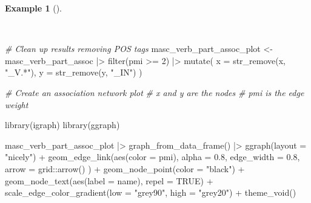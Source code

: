 \documentclass[
  letterpaper,
]{latex/krantz}
\newenvironment{Shaded}{\begin{snugshade}}{\end{snugshade}}
\newcommand{\AttributeTok}[1]{\textcolor[rgb]{0.00,0.00,0.00}{#1}}
\newcommand{\CommentTok}[1]{\textcolor[rgb]{0.00,0.00,0.00}{\textit{#1}}}
\newcommand{\ConstantTok}[1]{\textcolor[rgb]{0.00,0.00,0.00}{#1}}
\newcommand{\DecValTok}[1]{\textcolor[rgb]{0.00,0.00,0.00}{#1}}
\newcommand{\FloatTok}[1]{\textcolor[rgb]{0.00,0.00,0.00}{#1}}
\newcommand{\FunctionTok}[1]{\textcolor[rgb]{0.00,0.00,0.00}{#1}}
\newcommand{\NormalTok}[1]{\textcolor[rgb]{0.00,0.00,0.00}{#1}}
\newcommand{\OtherTok}[1]{\textcolor[rgb]{0.00,0.00,0.00}{#1}}
\newcommand{\SpecialCharTok}[1]{\textcolor[rgb]{0.00,0.00,0.00}{#1}}
\newcommand{\StringTok}[1]{\textcolor[rgb]{0.00,0.00,0.00}{#1}}
\theoremstyle{definition}
\newtheorem{example}{Example}[chapter]
\theoremstyle{remark}
\begin{document}
\begin{example}[]\protect\hypertarget{exm-eda-masc-verb-part-network}{}\label{exm-eda-masc-verb-part-network}

~

\begin{Shaded}
\begin{Highlighting}[]
\CommentTok{\# Clean up results removing POS tags}
\NormalTok{masc\_verb\_part\_assoc\_plot }\OtherTok{\textless{}{-}}
\NormalTok{  masc\_verb\_part\_assoc }\SpecialCharTok{|\textgreater{}}
  \FunctionTok{filter}\NormalTok{(pmi }\SpecialCharTok{\textgreater{}=} \DecValTok{2}\NormalTok{) }\SpecialCharTok{|\textgreater{}}
  \FunctionTok{mutate}\NormalTok{(}
    \AttributeTok{x =} \FunctionTok{str\_remove}\NormalTok{(x, }\StringTok{"\_V.*"}\NormalTok{),}
    \AttributeTok{y =} \FunctionTok{str\_remove}\NormalTok{(y, }\StringTok{"\_IN"}\NormalTok{)}
\NormalTok{  )}

\CommentTok{\# Create an association network plot}
\CommentTok{\# \textasciigrave{}x\textasciigrave{} and \textasciigrave{}y\textasciigrave{} are the nodes}
\CommentTok{\# \textasciigrave{}pmi\textasciigrave{} is the edge weight}

\FunctionTok{library}\NormalTok{(igraph)}
\FunctionTok{library}\NormalTok{(ggraph)}

\NormalTok{masc\_verb\_part\_assoc\_plot }\SpecialCharTok{|\textgreater{}}
  \FunctionTok{graph\_from\_data\_frame}\NormalTok{() }\SpecialCharTok{|\textgreater{}}
  \FunctionTok{ggraph}\NormalTok{(}\AttributeTok{layout =} \StringTok{"nicely"}\NormalTok{) }\SpecialCharTok{+}
  \FunctionTok{geom\_edge\_link}\NormalTok{(}\FunctionTok{aes}\NormalTok{(}\AttributeTok{color =}\NormalTok{ pmi),}
    \AttributeTok{alpha =} \FloatTok{0.8}\NormalTok{,}
    \AttributeTok{edge\_width =} \FloatTok{0.8}\NormalTok{,}
    \AttributeTok{arrow =}\NormalTok{ grid}\SpecialCharTok{::}\FunctionTok{arrow}\NormalTok{()}
\NormalTok{  ) }\SpecialCharTok{+}
  \FunctionTok{geom\_node\_point}\NormalTok{(}\AttributeTok{color =} \StringTok{"black"}\NormalTok{) }\SpecialCharTok{+}
  \FunctionTok{geom\_node\_text}\NormalTok{(}\FunctionTok{aes}\NormalTok{(}\AttributeTok{label =}\NormalTok{ name), }\AttributeTok{repel =} \ConstantTok{TRUE}\NormalTok{) }\SpecialCharTok{+}
  \FunctionTok{scale\_edge\_color\_gradient}\NormalTok{(}\AttributeTok{low =} \StringTok{"grey90"}\NormalTok{, }\AttributeTok{high =} \StringTok{"grey20"}\NormalTok{) }\SpecialCharTok{+}
  \FunctionTok{theme\_void}\NormalTok{()}
\end{Highlighting}
\end{Shaded}


\end{example}
\end{document}
